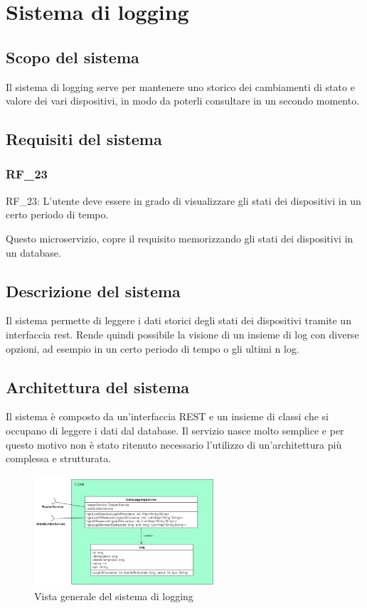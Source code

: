 \chapter{Sistema di logging}\label{cap:microservizio-logging}

\section{Scopo del sistema}

Il sistema di logging serve per mantenere uno storico dei cambiamenti di stato e valore dei vari dispositivi, in modo da poterli consultare in un secondo momento. 

\section{Requisiti del sistema}

\subsection{RF\_23}

RF\_23: L'utente deve essere in grado di visualizzare gli stati dei dispositivi in un certo periodo di tempo.

Questo microservizio, copre il requisito memorizzando gli stati dei dispositivi in un database.

\section{Descrizione del sistema}
Il sistema permette di leggere i dati storici degli stati dei dispositivi tramite un interfaccia rest. Rende quindi possibile la visione di un insieme di log con diverse opzioni, ad esempio in un certo periodo di tempo o gli ultimi n log.

\section{Architettura del sistema}

Il sistema è composto da un'interfaccia REST e un insieme di classi che si occupano di leggere i dati dal database.
Il servizio nasce molto semplice e per questo motivo non è stato ritenuto necessario l'utilizzo di un'architettura più complessa e strutturata.

\begin{figure}[ht]
    \centering
    \includegraphics[width=0.6\textwidth]{img/classi_logging.png}
    \caption{Vista generale del sistema di logging}
    \label{fig:general_logging}
\end{figure}

